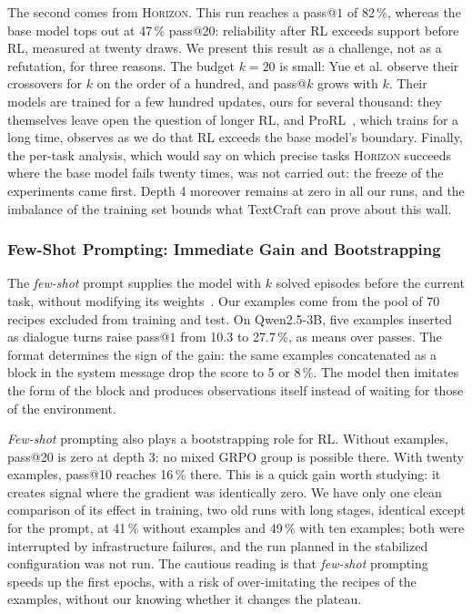 \documentclass[11pt,a4paper]{article}
\begin{document}
The second comes from \textsc{Horizon}. This run reaches a pass@$1$ of 82\,\%, whereas the base model tops out at 47\,\% pass@20: reliability after RL exceeds support before RL, measured at twenty draws. We present this result as a challenge, not as a refutation, for three reasons. The budget $k=20$ is small: Yue et al. observe their crossovers for $k$ on the order of a hundred, and pass@$k$ grows with $k$. Their models are trained for a few hundred updates, ours for several thousand: they themselves leave open the question of longer RL, and ProRL~\cite{liu2025prorl}, which trains for a long time, observes as we do that RL exceeds the base model's boundary. Finally, the per-task analysis, which would say on which precise tasks \textsc{Horizon} succeeds where the base model fails twenty times, was not carried out: the freeze of the experiments came first. Depth 4 moreover remains at zero in all our runs, and the imbalance of the training set bounds what TextCraft can prove about this wall.

\subsubsection{Few-Shot Prompting: Immediate Gain and Bootstrapping}

The \emph{few-shot} prompt supplies the model with $k$ solved episodes before the current task, without modifying its weights~\cite{brown2020gpt3}. Our examples come from the pool of 70 recipes excluded from training and test. On Qwen2.5-3B, five examples inserted as dialogue turns raise pass@$1$ from 10.3 to 27.7\,\%, as means over passes. The format determines the sign of the gain: the same examples concatenated as a block in the system message drop the score to 5 or 8\,\%. The model then imitates the form of the block and produces observations itself instead of waiting for those of the environment.

\emph{Few-shot} prompting also plays a bootstrapping role for RL. Without examples, pass@20 is zero at depth 3: no mixed GRPO group is possible there. With twenty examples, pass@10 reaches 16\,\% there. This is a quick gain worth studying: it creates signal where the gradient was identically zero. We have only one clean comparison of its effect in training, two old runs with long stages, identical except for the prompt, at 41\,\% without examples and 49\,\% with ten examples; both were interrupted by infrastructure failures, and the run planned in the stabilized configuration was not run. The cautious reading is that \emph{few-shot} prompting speeds up the first epochs, with a risk of over-imitating the recipes of the examples, without our knowing whether it changes the plateau.
\end{document}
